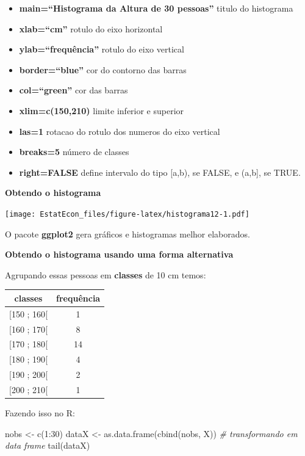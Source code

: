 \documentclass[
]{book}
\newenvironment{Shaded}{\begin{snugshade}}{\end{snugshade}}
\newcommand{\CommentTok}[1]{\textcolor[rgb]{0.56,0.35,0.01}{\textit{#1}}}
\newcommand{\DecValTok}[1]{\textcolor[rgb]{0.00,0.00,0.81}{#1}}
\newcommand{\FunctionTok}[1]{\textcolor[rgb]{0.00,0.00,0.00}{#1}}
\newcommand{\NormalTok}[1]{#1}
\newcommand{\OtherTok}[1]{\textcolor[rgb]{0.56,0.35,0.01}{#1}}
\newcommand{\SpecialCharTok}[1]{\textcolor[rgb]{0.00,0.00,0.00}{#1}}
\providecommand{\tightlist}{%
  \setlength{\itemsep}{0pt}\setlength{\parskip}{0pt}}
\begin{document}
\begin{itemize}
\tightlist
\item
  \textbf{main=``Histograma da Altura de 30 pessoas''} titulo do histograma
\item
  \textbf{xlab=``cm''} rotulo do eixo horizontal
\item
  \textbf{ylab=``frequência''} rotulo do eixo vertical
\item
  \textbf{border=``blue''} cor do contorno das barras
\item
  \textbf{col=``green''} cor das barras
\item
  \textbf{xlim=c(150,210)} limite inferior e superior
\item
  \textbf{las=1} rotacao do rotulo dos numeros do eixo vertical
\item
  \textbf{breaks=5} número de classes
\item
  \textbf{right=FALSE} define intervalo do tipo {[}a,b), se FALSE, e (a,b{]}, se TRUE.
\end{itemize}

\textbf{Obtendo o histograma}

\texttt{[image: EstatEcon\_files/figure-latex/histograma12-1.pdf]}

O pacote \textbf{ggplot2} gera gráficos e histogramas melhor elaborados.

\textbf{Obtendo o histograma usando uma forma alternativa}

Agrupando essas pessoas em \textbf{classes} de 10 cm temos:

\begin{longtable}[]{@{}cc@{}}
\toprule
classes & frequência \\
\midrule
\endhead
{[}150 ; 160{[} & 1 \\
{[}160 ; 170{[} & 8 \\
{[}170 ; 180{[} & 14 \\
{[}180 ; 190{[} & 4 \\
{[}190 ; 200{[} & 2 \\
{[}200 ; 210{[} & 1 \\
\bottomrule
\end{longtable}

Fazendo isso no R:

\begin{Shaded}
\begin{Highlighting}[]
\NormalTok{nobs }\OtherTok{\textless{}{-}} \FunctionTok{c}\NormalTok{(}\DecValTok{1}\SpecialCharTok{:}\DecValTok{30}\NormalTok{)}
\NormalTok{dataX }\OtherTok{\textless{}{-}} \FunctionTok{as.data.frame}\NormalTok{(}\FunctionTok{cbind}\NormalTok{(nobs, X))}
\CommentTok{\# transformando em data frame}
\FunctionTok{tail}\NormalTok{(dataX)}
\end{Highlighting}
\end{Shaded}
\end{document}
